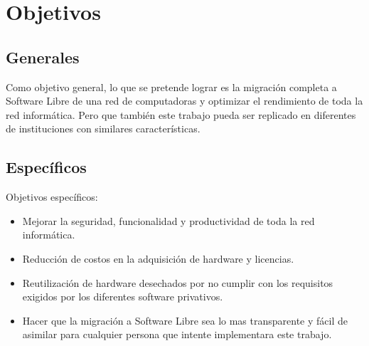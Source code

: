 \chapter{Objetivos}\label{ch:objetivos}

	\section{Generales}\label{sec:generales}
		
		Como objetivo general, lo que se pretende lograr es la migración completa a Software Libre de una red de computadoras y optimizar el rendimiento de toda la red informática. Pero que también este trabajo pueda ser replicado en diferentes de instituciones con similares características.\par
	
	\section{Específicos}\label{sec:especificos}
	
			Objetivos específicos:
			
			\begin{itemize}
				
				\item Mejorar la seguridad, funcionalidad y productividad de toda la red informática.
				
				\item Reducción de costos en la adquisición de hardware y licencias.
				
				\item Reutilización de hardware desechados por no cumplir con los requisitos exigidos por los diferentes software privativos.
				
				\item Hacer que la migración a Software Libre sea lo mas transparente y fácil de asimilar para cualquier persona que intente implementara este trabajo.
			
			\end{itemize}